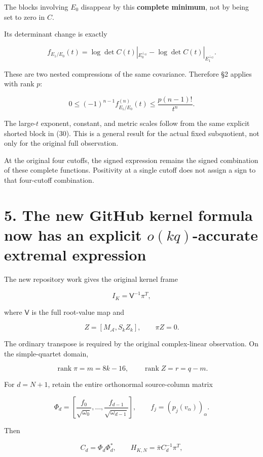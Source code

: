 \documentclass[11pt]{article}
\begin{document}
The blocks involving \(E_0\) disappear by this \textbf{complete minimum}, not by being set to zero in \(C\).

Its determinant change is exactly

\[
\boxed{
f_{E_1/E_0}(t)
=
\log\det C(t)|_{E_0^{\perp_G}}
-\log\det C(t)|_{E_1^{\perp_G}}.
}
\tag{31}
\]

These are two nested compressions of the same covariance. Therefore §2 applies with rank \(p\):

\[
\boxed{
0\le
(-1)^{n-1}f_{E_1/E_0}^{(n)}(t)
\le \frac{p(n-1)!}{t^n}.
}
\tag{32}
\]

The large-\(t\) exponent, constant, and metric scales follow from the same explicit shorted block in (30). This is a general result for the actual fixed subquotient, not only for the original full observation.

At the original four cutoffs, the signed expression remains the signed combination of these complete functions. Positivity at a single cutoff does not assign a sign to that four-cutoff combination.

\section{\texorpdfstring{5. The new GitHub kernel formula now has an explicit \(o(kq)\)-accurate extremal expression}{5. The new GitHub kernel formula now has an explicit o(kq)-accurate extremal expression}}\label{the-new-github-kernel-formula-now-has-an-explicit-okq-accurate-extremal-expression}

The new repository work gives the original kernel frame

\[
I_K=\mathsf V^{-1}\pi^T,
\]

where \(\mathsf V\) is the full root-value map and

\[
Z=[M_{\mathcal A},S_kZ_k],\qquad \pi Z=0.
\]

The ordinary transpose is required by the original complex-linear observation. On the simple-quartet domain,

\[
\operatorname{rank}\pi=m=8k-16,\qquad
\operatorname{rank}Z=r=q-m.
\]

For \(d=N+1\), retain the entire orthonormal source-column matrix

\[
\Phi_d=
\left[
\frac{f_0}{\sqrt{\omega_0}},\ldots,
\frac{f_{d-1}}{\sqrt{\omega_{d-1}}}
\right],
\qquad
f_j=(p_j(v_\alpha))_\alpha.
\]

Then

\[
C_d=\Phi_d\Phi_d^*,
\qquad
H_{K,N}=\bar\pi C_d^{-1}\pi^T,
\]
\end{document}
